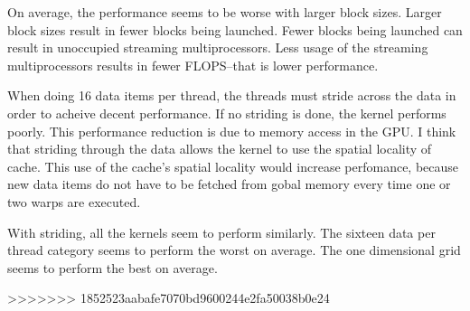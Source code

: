 \documentclass[a4paper,12pt]{article}
\begin{document}
On average, the performance seems to be worse with larger block sizes.
Larger block sizes result in fewer blocks being launched.
Fewer blocks being launched can result in unoccupied streaming multiprocessors.
Less usage of the streaming multiprocessors results in fewer FLOPS--that is lower performance.

When doing 16 data items per thread, the threads must stride across the data in order to acheive decent performance.
If no striding is done, the kernel performs poorly.
This performance reduction is due to memory access in the GPU.
I think that striding through the data allows the kernel to use the spatial locality of cache.
This use of the cache's spatial locality would increase perfomance, because new data items do not have to be fetched from gobal memory every time one or two warps are executed.

With striding, all the kernels seem to perform similarly.
The sixteen data per thread category seems to perform the worst on average.
The one dimensional grid seems to perform the best on average.


>>>>>>> 1852523aabafe7070bd9600244e2fa50038b0e24
\end{document}
